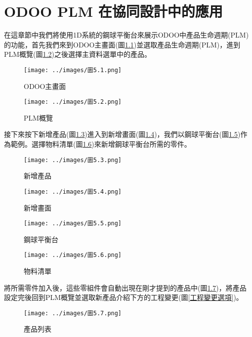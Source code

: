 \chapter{ODOO PLM 在協同設計中的應用}
在這章節中我們將使用1D系統的鋼球平衡台來展示ODOO中產品生命週期(PLM)的功能，首先我們來到ODOO主畫面(圖\ref{ODOO主畫面})並選取產品生命週期(PLM)，進到PLM概覽(圖\ref{PLM概覽})之後選擇主資料選單中的產品。


\begin{figure}[h!]
\centering
\texttt{[image: ../images/圖5.1.png]}
\caption{ODOO主畫面}
\label{ODOO主畫面}
\end{figure}
\begin{figure}[h!]
\centering
\texttt{[image: ../images/圖5.2.png]}
\caption{PLM概覽}\label{PLM概覽}
\end{figure}
接下來按下新增產品(圖\ref{新增產品})進入到新增畫面(圖\ref{新增畫面})，我們以鋼球平衡台(圖\ref{鋼球平衡台})作為範例。選擇物料清單(圖\ref{物料清單})來新增鋼球平衡台所需的零件。\\

\begin{figure}[h!]
\centering
\texttt{[image: ../images/圖5.3.png]}
\caption{新增產品}\label{新增產品}
\end{figure}

\begin{figure}[h!]
\centering
\texttt{[image: ../images/圖5.4.png]}
\caption{新增畫面}\label{新增畫面}
\end{figure}

\begin{figure}[h!]
\centering
\texttt{[image: ../images/圖5.5.png]}
\caption{鋼球平衡台}\label{鋼球平衡台}
\end{figure}

\begin{figure}[h!]
\centering
\texttt{[image: ../images/圖5.6.png]}
\caption{物料清單}\label{物料清單}
\end{figure}


將所需零件加入後，這些零組件會自動出現在剛才提到的產品中(圖\ref{產品列表})，將產品設定完後回到PLM概覽並選取新產品介紹下方的工程變更(圖\ref{工程變更選項})。\\

\begin{figure}[h!]
\centering
\texttt{[image: ../images/圖5.7.png]}
\caption{產品列表}\label{產品列表}
\end{figure}

